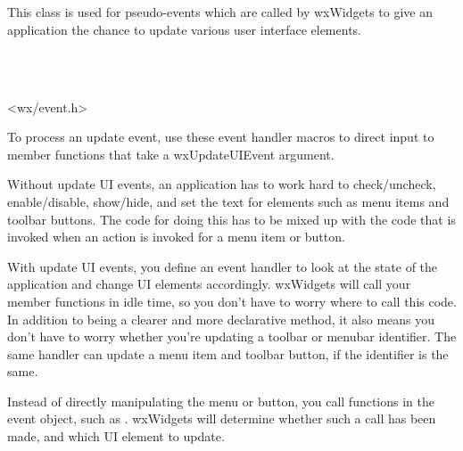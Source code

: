 \section{}\label{wxupdateuievent}

This class is used for pseudo-events which are called by wxWidgets
to give an application the chance to update various user interface elements.


\\
\\


<wx/event.h>


To process an update event, use these event handler macros to direct input to member
functions that take a wxUpdateUIEvent argument.

\twocolwidtha{7cm}
\begin{twocollist}\itemsep=0pt
\end{twocollist}


Without update UI events, an application has to work hard to check/uncheck, enable/disable,
show/hide, and set the text for elements such as menu items and toolbar buttons.
The code for doing this has to be mixed up with the code that is invoked when
an action is invoked for a menu item or button.

With update UI events, you define an event handler to look at the state of
the application and change UI elements accordingly. wxWidgets will call your
member functions in idle time, so you don't have to worry where to call this code.
In addition to being a clearer and more declarative method, it also means you
don't have to worry whether you're updating a toolbar or menubar identifier.
The same handler can update a menu item and toolbar button, if the identifier is the same.

Instead of directly manipulating the menu or button, you call functions in the event
object, such as . wxWidgets
will determine whether such a call has been made, and which UI element to update.

